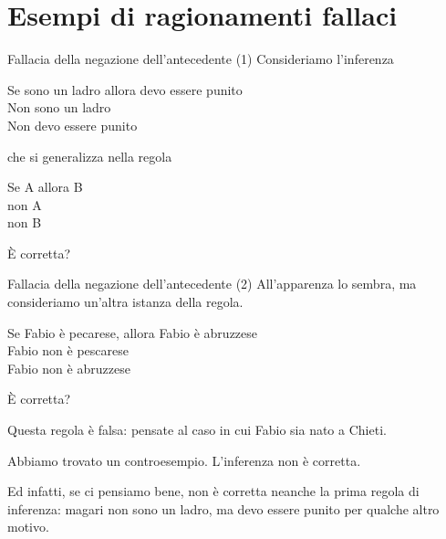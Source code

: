 \documentclass[aspectratio=169,10pt,dvipsnames,handout]{beamer}
\begin{document}
\section{Esempi di ragionamenti fallaci}

\begin{frame}{Fallacia della negazione dell'antecedente (1)}
	Consideriamo l'inferenza
	\begin{center}
		\begin{inference}
			Se sono un ladro allora devo essere punito\\
			Non sono un ladro\\
			\hline
			Non devo essere punito
		\end{inference}
	\end{center}
	che si generalizza nella regola
	\begin{center}
		\begin{inference}
			Se A allora B\\
			non A\\
			\hline
			non B
		\end{inference}
	\end{center}
	È corretta?
\end{frame}

\begin{frame}{Fallacia della negazione dell'antecedente (2)}
	All'apparenza lo sembra, ma consideriamo un'altra istanza della regola.
	\begin{center}
		\begin{inference}
			Se Fabio è pecarese, allora Fabio è abruzzese \only<3->{\checkmark}\\
			Fabio non è pescarese \only<4->{\checkmark}\\
			\hline
			Fabio non è abruzzese \only<5->{\xmark}
		\end{inference}
	\end{center}
	È corretta?

	\pause
	\medskip
	Questa regola è falsa: pensate al caso in cui Fabio sia nato a Chieti.

	\medskip
	Abbiamo trovato un \alert{controesempio}. L'inferenza non è corretta.

	\medskip
	Ed infatti, se ci pensiamo bene, non è corretta neanche la prima regola di inferenza: magari non sono un ladro, ma devo essere punito per qualche altro motivo.
\end{frame}
\end{document}
